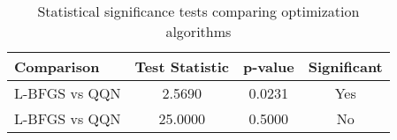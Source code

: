 \begin{table}[htbp]
\centering
\caption{Statistical significance tests comparing optimization algorithms}
\label{tab:significance}
\begin{tabular}{lccc}
\toprule
Comparison & Test Statistic & p-value & Significant \\
\midrule
L-BFGS vs QQN & 2.5690 & 0.0231 & Yes \\
L-BFGS vs QQN & 25.0000 & 0.5000 & No \\
\bottomrule
\end{tabular}
\end{table}
